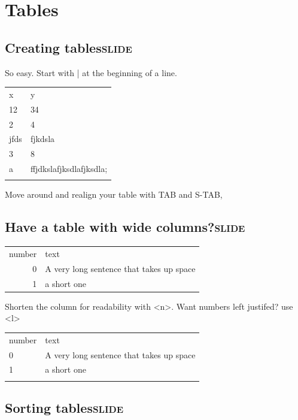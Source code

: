 \documentclass[11pt]{article}
\begin{document}
\section{Tables}
\label{sec-9}
\subsection{Creating tables\hfill{}\textsc{slide}}
\label{sec-9-1}

So easy. Start with | at the beginning of a line.

\begin{center}
\begin{tabular}{ll}
x & y\\
12 & 34\\
2 & 4\\
jfds & fjkdsla\\
3 & 8\\
a & ffjdkslafjksdlafjksdla;\\
 & \\
\end{tabular}
\end{center}
Move around and realign your table with TAB and S-TAB,

\subsection{Have a table with wide columns?\hfill{}\textsc{slide}}
\label{sec-9-2}

\begin{center}
\begin{tabular}{rl}
number & text\\
0 & A very long sentence that takes up space\\
1 & a short one\\
\end{tabular}
\end{center}

Shorten the column for readability with <n>. Want numbers left justifed? use <l>
\begin{center}
\begin{tabular}{ll}
number & text\\
0 & A very long sentence that takes up space\\
1 & a short one\\
 & \\
\end{tabular}
\end{center}

\subsection{Sorting tables\hfill{}\textsc{slide}}
\label{sec-9-3}
\end{document}
